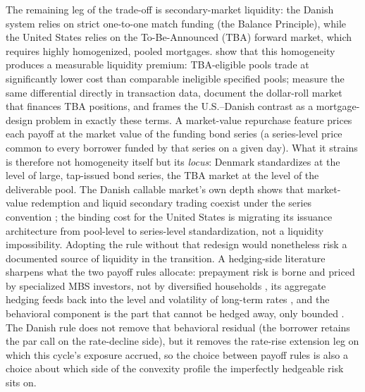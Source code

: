 \documentclass[12pt]{article}
\begin{document}
The remaining leg of the trade-off is secondary-market liquidity: the Danish system relies on strict one-to-one match funding (the Balance Principle), while the United States relies on the To-Be-Announced (TBA) forward market, which requires highly homogenized, pooled mortgages. \citet{vickery2013} show that this homogeneity produces a measurable liquidity premium: TBA-eligible pools trade at significantly lower cost than comparable ineligible specified pools; \citet{gao2017} measure the same differential directly in transaction data, \citet{song2019} document the dollar-roll market that finances TBA positions, and \citet{campbell2013} frames the U.S.--Danish contrast as a mortgage-design problem in exactly these terms. A market-value repurchase feature prices each payoff at the market value of the funding bond series (a series-level price common to every borrower funded by that series on a given day). What it strains is therefore not homogeneity itself but its \emph{locus}: Denmark standardizes at the level of large, tap-issued bond series, the TBA market at the level of the deliverable pool. The Danish callable market's own depth shows that market-value redemption and liquid secondary trading coexist under the series convention \citep{berg2018}; the binding cost for the United States is migrating its issuance architecture from pool-level to series-level standardization, not a liquidity impossibility. Adopting the rule without that redesign would nonetheless risk a documented source of liquidity in the transition. A hedging-side literature sharpens what the two payoff rules allocate: prepayment risk is borne and priced by specialized MBS investors, not by diversified households \citep{gabaix2007}, its aggregate hedging feeds back into the level and volatility of long-term rates \citep{malkhozov2016}, and the behavioral component is the part that cannot be hedged away, only bounded \citep{perotti2024}. The Danish rule does not remove that behavioral residual (the borrower retains the par call on the rate-decline side), but it removes the rate-rise extension leg on which this cycle's exposure accrued, so the choice between payoff rules is also a choice about which side of the convexity profile the imperfectly hedgeable risk sits on.
\end{document}
